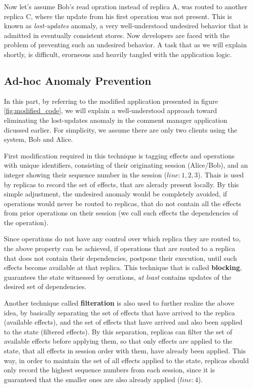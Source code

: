 Now let's assume Bob's read opration instead of replica A, was routed
to another replica C, where the update from his first operation was not
present. This is known as \emph{lost-updates} anomaly, a very
well-understood
undesired behavior that is admitted in eventually consistent stores. 
Now developers are faced with the problem of preventing such an undesired
behavior. A task that as we will explain shortly, is difficult,
erorneous and heavily tangled with the application logic.
%
%
\subsection{Ad-hoc Anomaly Prevention}
In this part, by referring to the modified application  presented in figure
\ref{fig:modified_code}, we will
explain a well-understood approach toward eliminating the lost-updates anomaly in
the  comment manager application dicussed earlier. For simplicity, we
assume there are only two clients using the system, Bob and Alice.

First modification required in this technique is tagging effects and
operations with
unique identifiers, consisting of their originating session (Alice/Bob),
and an integer showing their
sequence number in the session ($line:1,2,3$). Thais is used by replicas to
record the set of effects, that are alerady present locally.
By this simple adjustment, the undesired anomaly would
be completely avoided, if operations would never be routed to replicas,
that do not contain all the effects from prior operations on their
session (we call such effects the dependencies of
the operation). 

Since operations do not have any control over which replica they are
routed to, the above property can be achieved, if operations that are
routed to a replica that does not contain their dependencies, postpone
their execution, until such effects become available at that replica.
This technique that is called {\bf blocking}, guarantees the state
witnessed by oerations, \emph{at least} contains updates of the desired set
of dependencies.

Another technique called {\bf filteration} is also used to further realize
the above idea, by basically separating the set of effects that have
arrived to the replica (available effects), and the set of effects that have
arrived and also been applied to the state (filtered effects).
By this separation, replicas can filter the set of available effects before
applying them, so that only effects are applied to the state, that all
effects in session order with them, have already been applied.
This way, in order to maintain the set of all effects applied to the state, 
replicas should only  record the highest sequence
numbers from each session, since it
is guaranteed that the smaller ones are also already applied ($line:4$). 

